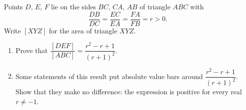 Points $D$, $E$, $F$ lie on the sides $BC$, $CA$, $AB$ of triangle $ABC$ with
\[\dfrac{DB}{DC}=\dfrac{EC}{EA}=\dfrac{FA}{FB}=r>0.\]
Write $[XYZ]$ for the area of triangle $XYZ$.
\begin{enumerate}
\item[(a)] Prove that $\dfrac{[DEF]}{[ABC]}=\dfrac{r^2-r+1}{(r+1)^2}$.
\item[(b)] Some statements of this result put absolute value bars around $\dfrac{r^2-r+1}{(r+1)^2}$. Show that they make no difference: the expression is positive for every real $r\ne-1$.
\end{enumerate}
